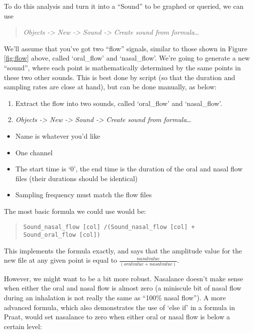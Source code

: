 \documentclass[11pt]{article}
\def\tightlist{}
\begin{document}
To do this analysis and turn it into a ``Sound'' to be graphed or
queried, we can use

\begin{quote}
\emph{Objects -\textgreater{} New -\textgreater{} Sound -\textgreater{}
Create sound from formula\ldots{}}
\end{quote}

We'll assume that you've got two ``flow'' signals, similar to those
shown in Figure \ref{fig:flow} above, called `oral\_flow' and
`nasal\_flow'. We're going to generate a new ``sound'', where each point
is mathematically determined by the same points in these two other
sounds. This is best done by script (so that the duration and sampling
rates are close at hand), but can be done manually, as below:

\begin{enumerate}
\def\labelenumi{\arabic{enumi}.}
\tightlist
\item
  Extract the flow into two sounds, called `oral\_flow' and
  `nasal\_flow'.
\item
  \emph{Objects -\textgreater{} New -\textgreater{} Sound
  -\textgreater{} Create sound from formula\ldots{}}
\end{enumerate}

\begin{itemize}
\tightlist
\item
  Name is whatever you'd like
\item
  One channel
\item
  The start time is `0', the end time is the duration of the oral and
  nasal flow files (their durations should be identical)
\item
  Sampling frequency must match the flow files
\end{itemize}

The most basic formula we could use would be:

\begin{quote}
\texttt{Sound\_nasal\_flow [col] /(Sound\_nasal\_flow [col] + Sound\_oral\_flow [col])}
\end{quote}

This implements the formula exactly, and says that the amplitude value
for the new file at any given point is equal to
\(\frac{nasal value}{(oral value + nasal value)}\).

However, we might want to be a bit more robust. Nasalance doesn't make
sense when either the oral and nasal flow is almost zero (a miniscule
bit of nasal flow during an inhalation is not really the same as ``100\%
nasal flow''). A more advanced formula, which also demonstrates the use
of `else if' in a formula in Praat, would set nasalance to zero when
either oral or nasal flow is below a certain level:
\end{document}

